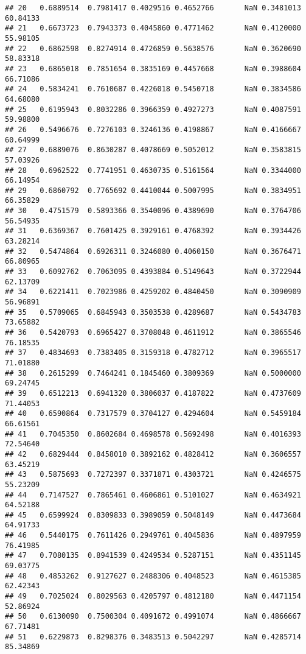 \documentclass[]{article}
\begin{document}
\begin{verbatim}
## 20   0.6889514  0.7981417 0.4029516 0.4652766       NaN 0.3481013     60.84133
## 21   0.6673723  0.7943373 0.4045860 0.4771462       NaN 0.4120000     55.98105
## 22   0.6862598  0.8274914 0.4726859 0.5638576       NaN 0.3620690     58.83318
## 23   0.6865018  0.7851654 0.3835169 0.4457668       NaN 0.3988604     66.71086
## 24   0.5834241  0.7610687 0.4226018 0.5450718       NaN 0.3834586     64.68080
## 25   0.6195943  0.8032286 0.3966359 0.4927273       NaN 0.4087591     59.98800
## 26   0.5496676  0.7276103 0.3246136 0.4198867       NaN 0.4166667     60.64999
## 27   0.6889076  0.8630287 0.4078669 0.5052012       NaN 0.3583815     57.03926
## 28   0.6962522  0.7741951 0.4630735 0.5161564       NaN 0.3344000     66.14954
## 29   0.6860792  0.7765692 0.4410044 0.5007995       NaN 0.3834951     66.35829
## 30   0.4751579  0.5893366 0.3540096 0.4389690       NaN 0.3764706     56.54935
## 31   0.6369367  0.7601425 0.3929161 0.4768392       NaN 0.3934426     63.28214
## 32   0.5474864  0.6926311 0.3246080 0.4060150       NaN 0.3676471     66.80965
## 33   0.6092762  0.7063095 0.4393884 0.5149643       NaN 0.3722944     62.13709
## 34   0.6221411  0.7023986 0.4259202 0.4840450       NaN 0.3090909     56.96891
## 35   0.5709065  0.6845943 0.3503538 0.4289687       NaN 0.5434783     73.65882
## 36   0.5420793  0.6965427 0.3708048 0.4611912       NaN 0.3865546     76.18535
## 37   0.4834693  0.7383405 0.3159318 0.4782712       NaN 0.3965517     71.01880
## 38   0.2615299  0.7464241 0.1845460 0.3809369       NaN 0.5000000     69.24745
## 39   0.6512213  0.6941320 0.3806037 0.4187822       NaN 0.4737609     71.44053
## 40   0.6590864  0.7317579 0.3704127 0.4294604       NaN 0.5459184     66.61561
## 41   0.7045350  0.8602684 0.4698578 0.5692498       NaN 0.4016393     72.54640
## 42   0.6829444  0.8458010 0.3892162 0.4828412       NaN 0.3606557     63.45219
## 43   0.5875693  0.7272397 0.3371871 0.4303721       NaN 0.4246575     55.23209
## 44   0.7147527  0.7865461 0.4606861 0.5101027       NaN 0.4634921     64.52188
## 45   0.6599924  0.8309833 0.3989059 0.5048149       NaN 0.4473684     64.91733
## 46   0.5440175  0.7611426 0.2949761 0.4045836       NaN 0.4897959     76.41985
## 47   0.7080135  0.8941539 0.4249534 0.5287151       NaN 0.4351145     69.03775
## 48   0.4853262  0.9127627 0.2488306 0.4048523       NaN 0.4615385     62.42343
## 49   0.7025024  0.8029563 0.4205797 0.4812180       NaN 0.4471154     52.86924
## 50   0.6130090  0.7500304 0.4091672 0.4991074       NaN 0.4866667     67.71481
## 51   0.6229873  0.8298376 0.3483513 0.5042297       NaN 0.4285714     85.34869

\end{verbatim}
\end{document}
